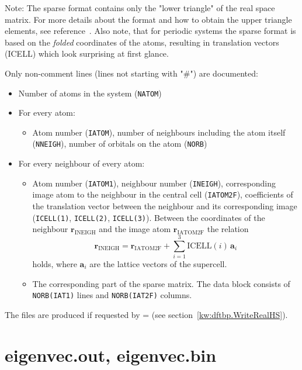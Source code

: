 Note: The sparse format contains only the "lower triangle" of the real
space matrix. For more details about the format and how to obtain the
upper triangle elements, see reference~\cite{dftbp-2007paper}. Also note,
that for periodic systems the sparse format is based on the
\emph{folded} coordinates of the atoms, resulting in translation
vectors (ICELL) which look surprising at first glance.

Only non-comment lines (lines not starting with "\#") are documented:
\begin{itemize}
\item Number of atoms in the system (\verb|NATOM|)
\item For every atom:
  \begin{itemize}
  \item Atom number (\verb|IATOM|), number of neighbours including the
    atom itself (\verb|NNEIGH|), number of orbitals on the atom
    (\verb|NORB|)
  \end{itemize}
\item For every neighbour of every atom:
  \begin{itemize}
  \item Atom number (\verb|IATOM1|), neighbour number (\verb|INEIGH|),
    corresponding image atom to the neighbour in the central cell
    (\verb|IATOM2F|), coefficients of the translation vector between
    the neighbour and its corresponding image (\verb|ICELL(1)|,
    \verb|ICELL(2)|, \verb|ICELL(3)|). Between the coordinates of the
    neighbour $\mathbf{r}_{\text{INEIGH}}$ and the image atom
    $\mathbf{r}_{\text{IATOM2F}}$ the relation
    \begin{equation*}
      \mathbf{r}_{\text{INEIGH}} = \mathbf{r}_{\text{IATOM2F}} + \sum_{i=1}^3
      \text{ICELL}(i)\, \mathbf{a}_i
    \end{equation*}
    holds, where $\mathbf{a}_i$ are the lattice vectors of the supercell.
  \item The corresponding part of the sparse matrix. The data block
    consists of \verb|NORB(IAT1)| lines and \verb|NORB(IAT2F)| columns.
  \end{itemize}
\end{itemize}

The files are produced if requested by  = 
(see section~\ref{kw:dftbp.WriteRealHS}).

\section{eigenvec.out, eigenvec.bin}
\label{sec:dftbp.eigenvec}

